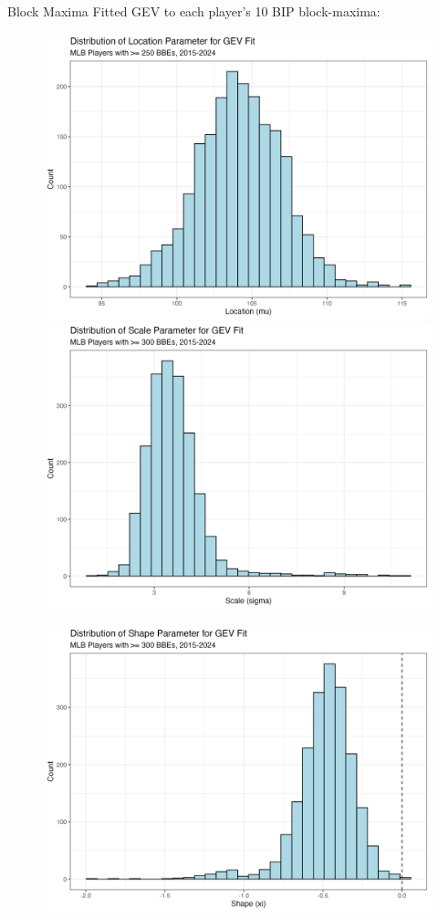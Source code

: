 \documentclass{beamer}
\begin{document}
\begin{frame}[allowframebreaks]{Block Maxima}
    Fitted GEV to each player's 10 BIP block-maxima:
    \begin{figure}
        \includegraphics[width=0.49\linewidth]{plots/location.png}
        \hfill
        \includegraphics[width=0.49\linewidth]{plots/scale.png}
    \end{figure}
    \begin{figure}
        \centering
        \includegraphics[width=0.85\linewidth]{plots/shape.png}
    \end{figure}
\end{frame}
\end{document}
